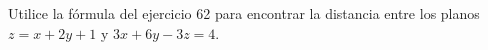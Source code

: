 \item Utilice la fórmula del ejercicio 62 para encontrar la distancia entre los planos $z = x + 2y + 1$ y $3x + 6y - 3z = 4$.

